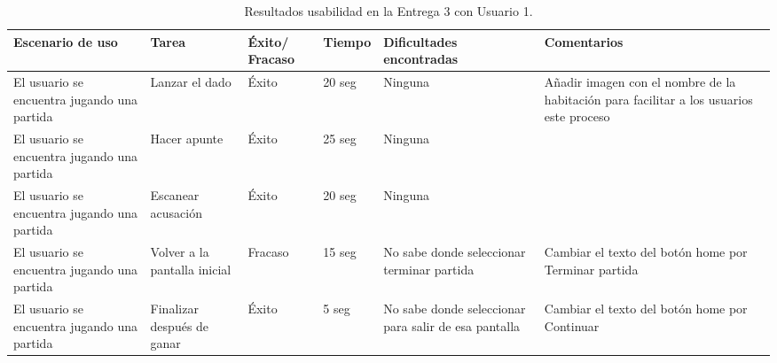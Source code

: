 \begin{table}[h]
  \begin{center}
    \begin{tabular}{|p{2.5cm}|p{1.75cm}|p{1.25cm}|p{1.25cm}|p{2.75cm}|p{3.5cm}|}

      \hline
        \rowcolor{Gray} \textbf{Escenario de uso}
        & \textbf{Tarea}
        & \textbf{Éxito/ Fracaso}
        & \textbf{Tiempo}
        & \textbf{Dificultades encontradas}
        & \textbf{Comentarios}\\

      \hline
      El usuario se encuentra jugando una partida
      & Lanzar el dado
      & Éxito
      & 20 seg
      & Ninguna
      & Añadir imagen con el nombre de la habitación para facilitar a los usuarios este proceso\\

      \hline
      El usuario se encuentra jugando una partida
      & Hacer apunte
      & Éxito
      & 25 seg
      & Ninguna
      &\\

      \hline
      El usuario se encuentra jugando una partida
      & Escanear acusación
      & Éxito
      & 20 seg
      & Ninguna
      &\\

      \hline
      El usuario se encuentra jugando una partida
      & Volver a la pantalla inicial
      & Fracaso
      & 15 seg
      & No sabe donde seleccionar terminar partida
      & Cambiar el texto del botón home por Terminar partida\\

      \hline
      El usuario se encuentra jugando una partida
      & Finalizar después de ganar
      & Éxito
      & 5 seg
      & No sabe donde seleccionar para salir de esa pantalla
      & Cambiar el texto del botón home por Continuar\\

      \hline

    \end{tabular}

    \caption{Resultados usabilidad en la Entrega 3 con Usuario 1.}
    \label{tabla-entrega-3-usuario1}

  \end{center}
\end{table}


